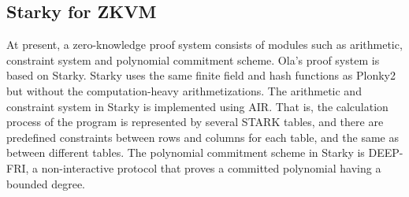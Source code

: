 \subsection{Starky for ZKVM}\label{section: starky-zkvm}

At present, a zero-knowledge proof system consists of modules such as arithmetic, constraint system and polynomial commitment scheme. Ola's proof system is based on Starky. Starky uses the same finite field and hash functions as Plonky2 but without the computation-heavy arithmetizations. The arithmetic and constraint system in Starky is implemented using AIR. That is, the calculation process of the program is represented by several STARK tables, and there are predefined constraints between rows and columns for each table, and the same as between different tables. The polynomial commitment scheme in Starky is DEEP-FRI, a non-interactive protocol that proves a committed polynomial having a bounded degree.






